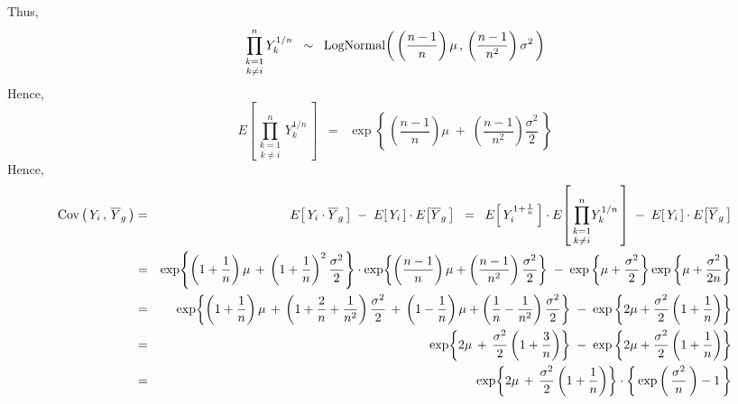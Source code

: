 Thus,
\begin{equation*}
\underset{k \neq i}{\prod_{k=1}^{n}}\,Y_{k}^{1/n}
\;\;\sim\;\;
\textnormal{LogNormal}
\!\left(\,\left(\dfrac{n-1}{n}\right)\mu\,,\,\left(\dfrac{n-1}{n^{2}}\right)\sigma^{2}\,\right)
\end{equation*}
Hence,
\begin{equation*}
E\!\left[\,\underset{k \neq i}{\prod_{k=1}^{n}}\,Y_{k}^{1/n}\,\right]
\;\;=\;\;
\exp
\!\left\{\,
\left(\dfrac{n-1}{n}\right)\mu\;+\;\left(\dfrac{n-1}{n^{2}}\right)\dfrac{\sigma^{2}}{2}
\,\right\}
\end{equation*}
Hence,
\begin{eqnarray*}
          \textnormal{Cov}\left(\, Y_{i} \,,\, \overline{Y}_{g} \,\right)
&=&       E\!\left[\,Y_{i}\cdot \overline{Y}_{g}\,\right]
          \;-\;
          E\!\left[\,Y_{i}\,\right]\cdot E\!\left[\overline{Y}_{g}\,\right]
\;\;=\;\; E\!\left[\,Y_{i}^{1+\frac{1}{n}}\,\right]
          \cdot
          E\!\left[\,\underset{k \neq i}{\prod_{k=1}^{n}}Y_{k}^{1/n} \,\right]
          \;-\;
          E\!\left[\,Y_{i}\,\right]\cdot E\!\left[\overline{Y}_{g}\,\right] \\
&=&       \exp\!\left\{
          \left(1+\frac{1}{n}\right)\mu
          \,+\,
          \left(1+\frac{1}{n}\right)^{2}\dfrac{\sigma^{2}}{2}
          \right\}
          \cdot
          \exp
          \!\left\{
          \left(\dfrac{n-1}{n}\right)\mu+\left(\dfrac{n-1}{n^{2}}\right)\dfrac{\sigma^{2}}{2}
          \right\}
          \; - \;
          \exp\left\{\mu + \frac{\sigma^{2}}{2} \right\}
          \exp\left\{\mu + \frac{\sigma^{2}}{2n}\right\} \\
&=&       \exp\!\left\{
          \left(1+\frac{1}{n}\right)\mu
          \,+\,
          \left(1+\frac{2}{n}+\dfrac{1}{n^{2}}\right)\dfrac{\sigma^{2}}{2}
          \,+\,
          \left(1-\dfrac{1}{n}\right)\mu+\left(\dfrac{1}{n}-\dfrac{1}{n^{2}}\right)\dfrac{\sigma^{2}}{2}
          \right\}
          \; - \;
          \exp\left\{2\mu + \frac{\sigma^{2}}{2}\left(1+\frac{1}{n}\right) \right\} \\
&=&       \exp\!\left\{
          2\mu \,+\,
          \dfrac{\sigma^{2}}{2}
          \left(1+\frac{3}{n}\right)
          \right\}
          \; - \;
          \exp\left\{2\mu + \frac{\sigma^{2}}{2}\left(1+\frac{1}{n}\right) \right\} \\
&=&       \exp\!\left\{
          2\mu \,+\,
          \dfrac{\sigma^{2}}{2}
          \left(1+\frac{1}{n}\right)
          \right\}
          \cdot
          \left\{\,\exp\left(\,\dfrac{\sigma^{2}}{n}\,\right)-1\,\right\} \\
\end{eqnarray*}



